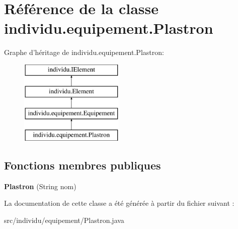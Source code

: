 \hypertarget{classindividu_1_1equipement_1_1_plastron}{\section{Référence de la classe individu.\-equipement.\-Plastron}
\label{classindividu_1_1equipement_1_1_plastron}
}
Graphe d'héritage de individu.\-equipement.\-Plastron\-:\begin{figure}[H]
\begin{center}
\leavevmode
\includegraphics[height=4.000000cm]{classindividu_1_1equipement_1_1_plastron}
\end{center}
\end{figure}
\subsection*{Fonctions membres publiques}
\begin{DoxyCompactItemize}
\item 
\hypertarget{classindividu_1_1equipement_1_1_plastron_ac95f0733dbb08cf0ad3af4dba28c90fe}{{\bfseries Plastron} (String nom)}\label{classindividu_1_1equipement_1_1_plastron_ac95f0733dbb08cf0ad3af4dba28c90fe}

\end{DoxyCompactItemize}


La documentation de cette classe a été générée à partir du fichier suivant \-:\begin{DoxyCompactItemize}
\item 
src/individu/equipement/Plastron.\-java\end{DoxyCompactItemize}
